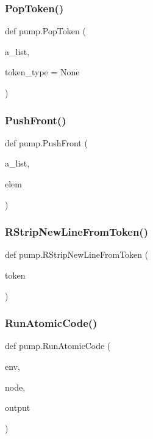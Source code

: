\subsubsection{\texorpdfstring{PopToken()}{PopToken()}}
{\footnotesize\ttfamily def pump.\+Pop\+Token (\begin{DoxyParamCaption}\item[{}]{a\+\_\+list,  }\item[{}]{token\+\_\+type = {\ttfamily None} }\end{DoxyParamCaption})}

\mbox{\label{namespacepump_a12c70577eb727526ac0ad17bf3b6c3a4}} 
\subsubsection{\texorpdfstring{PushFront()}{PushFront()}}
{\footnotesize\ttfamily def pump.\+Push\+Front (\begin{DoxyParamCaption}\item[{}]{a\+\_\+list,  }\item[{}]{elem }\end{DoxyParamCaption})}

\mbox{\label{namespacepump_ae07150d94399cbe1661abe5929f921e0}} 
\subsubsection{\texorpdfstring{RStripNewLineFromToken()}{RStripNewLineFromToken()}}
{\footnotesize\ttfamily def pump.\+R\+Strip\+New\+Line\+From\+Token (\begin{DoxyParamCaption}\item[{}]{token }\end{DoxyParamCaption})}

\mbox{\label{namespacepump_a901e6abd34691a0d779178a615cc09c1}} 
\subsubsection{\texorpdfstring{RunAtomicCode()}{RunAtomicCode()}}
{\footnotesize\ttfamily def pump.\+Run\+Atomic\+Code (\begin{DoxyParamCaption}\item[{}]{env,  }\item[{}]{node,  }\item[{}]{output }\end{DoxyParamCaption})}


